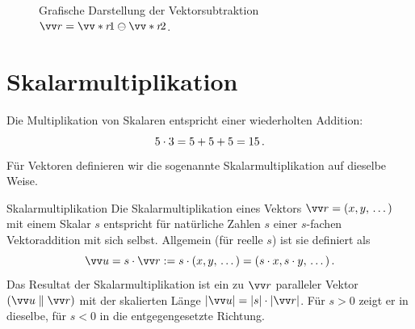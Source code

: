 \begin{figure}[h!]
\begin{minipage}[b]{0.48\textwidth}
{
    }
    \caption{Grafische Darstellung der Vektorsubtraktion $\protect\ivec{r} = \protect\ivecS{r}{1} \ominus \protect\ivecS{r}{2}$.}\label{fig: vektorsubtraktion}
    \end{minipage}
\end{figure}


\section{Skalarmultiplikation}\label{sec: Skalarmultiplikation}
Die Multiplikation von Skalaren entspricht einer wiederholten Addition: \[5 \cdot 3 = 5 + 5 + 5 = 15\,.\]
Für Vektoren definieren wir die sogenannte Skalarmultiplikation auf dieselbe Weise.
\begin{rememberbox}[]{Skalarmultiplikation}
    Die Skalarmultiplikation eines Vektors $\ivec{r} = (x,y,\,\dots)$ mit einem Skalar $s$ entspricht für natürliche Zahlen $s$ einer $s$-fachen Vektoraddition mit sich selbst. Allgemein (für reelle $s$) ist sie definiert als
    \begin{equation}
        \ivec{u} = s \cdot \ivec{r} := s\cdot (x,y,\,\dots) = (s \cdot x, s \cdot y, \,\dots)\mDot
    \end{equation}
    Das Resultat der Skalarmultiplikation ist ein zu $\ivec{r}$ paralleler Vektor $(\ivec{u} \parallel \ivec{r})$ mit der skalierten Länge $|\ivec{u}| = |s| \cdot |\ivec{r}|$. Für $s > 0$ zeigt er in dieselbe, für $s < 0$ in die entgegengesetzte Richtung.
\end{rememberbox}

